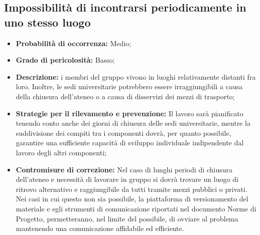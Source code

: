 \subsection{Impossibilità di incontrarsi periodicamente in uno stesso luogo}
\begin{itemize}
\item \textbf{Probabilità di occorrenza:} Medio;
\item \textbf{Grado di pericolosità:} Basso;
\item \textbf{Descrizione:} i membri del gruppo vivono in luoghi relativamente distanti fra loro. Inoltre, le sedi universitarie potrebbero essere irraggiungibili a causa della chiusura dell'ateneo o a causa di disservizi dei mezzi di trasporto;

\item \textbf{Strategie per il rilevamento e prevenzione:}  Il lavoro sarà pianificato tenendo conto anche dei giorni di chiusura delle sedi universitarie, mentre la suddivisione dei compiti tra i componenti dovrà, per quanto possibile, garantire una sufficiente capacità di sviluppo individuale indipendente dal lavoro degli altri componenti; 

\item \textbf{Contromisure di correzione:} Nel caso di lunghi periodi di chiusura dell'ateneo e necessità di lavorare in gruppo si dovrà trovare un luogo di ritrovo alternativo e raggiungibile da tutti tramite mezzi pubblici o privati. Nei casi in cui questo non sia possibile, la piattaforma di versionamento del materiale e egli strumenti di comunicazione riportati nel documento Norme di Progetto, permetteranno, nel limite del possibile, di ovviare al problema mantenendo una comunicazione affidabile ed efficiente.
\end{itemize}

\newpage